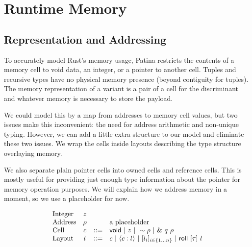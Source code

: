 
\section*{Runtime Memory}

\subsection*{Representation and Addressing}

To accurately model Rust's memory usage, Patina restricts
the contents of a memory cell to void data, an integer, or a pointer to another cell.
Tuples and recursive types have no physical memory presence (beyond contiguity for tuples).
The memory representation of a variant is a pair of a cell for the discriminant
and whatever memory is necessary to store the payload.

We could model this by a map from addresses to memory cell values,
but two issues make this inconvenient: the need for address arithmetic
and non-unique typing. However, we can add a little extra structure to
our model and eliminate these two issues. We wrap the cells inside
layouts describing the type structure overlaying memory.

We also separate plain pointer cells into owned cells and reference cells.
This is mostly useful for providing just enough type information about the pointer
for memory operation purposes. We will explain how we address memory in a moment,
so we use a placeholder for now.

\[
\begin{array}{lccl}
\textrm{Integer} & z & & \\
\textrm{Address} & \rho & & \textrm{a placeholder} \\
\textrm{Cell} & c & ::= & \mathsf{void} ~|~ z ~|~ \sim{\rho} ~|~ \&~{q~\rho} \\
\textrm{Layout} & l & ::= & c ~|~ \langle{{c}:{l}}\rangle ~|~ 
			       [{{l}_{i}}]_{{i} \in \{1 \ldots {n}\} } ~|~ \mathsf{roll}~[{\tau}]~{l} \\
\end{array}
\]


